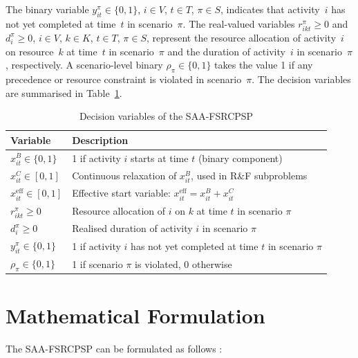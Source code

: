 The binary variable $y_{it}^{\pi} \in \{0, 1\}$, $i \in V$,
$t \in T$, $\pi \in S$, indicates that activity~$i$ has not yet
completed at time~$t$ in scenario~$\pi$. The real-valued variables
$r_{ikt}^{\pi} \geq 0$ and $d_i^{\pi} \geq 0$, $i \in V$,
$k \in K$, $t \in T$, $\pi \in S$, represent the resource
allocation of activity~$i$ on resource~$k$ at time~$t$ in
scenario~$\pi$ and the duration of activity~$i$ in scenario~$\pi$,
respectively. A scenario-level binary $\rho_{\pi} \in \{0, 1\}$
takes the value 1 if any precedence or resource constraint is
violated in scenario~$\pi$. The decision variables are summarised in
Table~\ref{tab:dec_vars}.

\begin{table}[htbp]
\centering
\caption{Decision variables of the SAA-FSRCPSP}
\label{tab:dec_vars}
\renewcommand{\arraystretch}{1.4}
\begin{tabular}{lp{9cm}}
\hline
\textbf{Variable} & \textbf{Description} \\
\hline
$x^B_{it} \in \{0,1\}$
    & 1 if activity $i$ starts at time $t$ (binary component) \\[4pt]
$x^C_{it} \in [0,1]$
    & Continuous relaxation of $x^B_{it}$, used in R\&F
      subproblems \\[4pt]
$x^{\mathrm{eff}}_{it} \in [0,1]$
    & Effective start variable:
      $x^{\mathrm{eff}}_{it} = x^B_{it} + x^C_{it}$ \\[4pt]
$r_{ikt}^{\pi} \geq 0$
    & Resource allocation of $i$ on $k$ at time $t$ in
      scenario $\pi$ \\[4pt]
$d_i^{\pi} \geq 0$
    & Realised duration of activity $i$ in scenario $\pi$ \\[4pt]
$y_{it}^{\pi} \in \{0,1\}$
    & 1 if activity $i$ has not yet completed at time $t$ in
      scenario $\pi$ \\[4pt]
$\rho_{\pi} \in \{0,1\}$
    & 1 if scenario $\pi$ is violated, 0 otherwise \\
\hline
\end{tabular}
\end{table}

\section{Mathematical Formulation}
\label{sec:math_model}

The SAA-FSRCPSP can be formulated as follows
\parencite{Mendl2024}:

